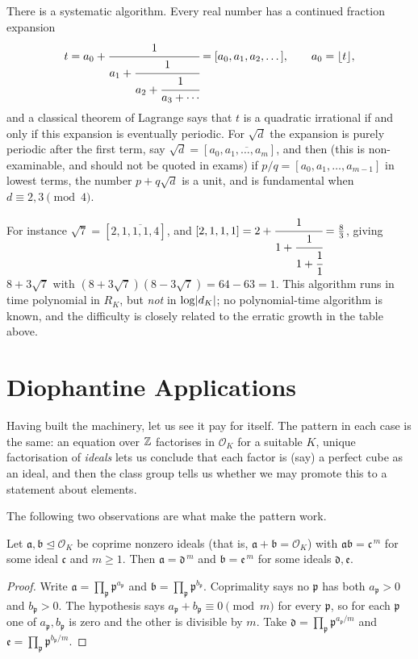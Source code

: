 \documentclass[a4paper]{scrartcl}
\renewcommand{\OO}{\mathcal{O}}
\newcommand{\fa}{\mathfrak{a}}
\newcommand{\fb}{\mathfrak{b}}
\newcommand{\fc}{\mathfrak{c}}
\newcommand{\fd}{\mathfrak{d}}
\newcommand{\fe}{\mathfrak{e}}
\newcommand{\fp}{\mathfrak{p}}
\begin{document}
\begin{remark}
	There is a systematic algorithm. Every real number has a continued fraction expansion
	$$t = a_0 + \cfrac{1}{a_1+\cfrac{1}{a_2+\cfrac{1}{a_3+\cdots}}} = [a_0,a_1,a_2,\dots], \qquad a_0 = \lfloor t\rfloor,$$
	and a classical theorem of Lagrange says that $t$ is a quadratic irrational if and only if this expansion is eventually periodic. For $\sqrt d$ the expansion is purely periodic after the first term, say $\sqrt d = [a_0,\overline{a_1,\dots,a_m}]$, and then (this is non-examinable, and should not be quoted in exams) if $p/q = [a_0,a_1,\dots,a_{m-1}]$ in lowest terms, the number $p+q\sqrt d$ is a unit, and is fundamental when $d \equiv 2,3\pmod4$.

	For instance $\sqrt7 = [2,\overline{1,1,1,4}]$, and $[2,1,1,1] = 2 + \cfrac{1}{1+\cfrac{1}{1+\cfrac11}} = \tfrac83$, giving $8+3\sqrt7$ with $(8+3\sqrt7)(8-3\sqrt7) = 64-63 = 1$. This algorithm runs in time polynomial in $R_K$, but \emph{not} in $\log\lvert d_K\rvert$; no polynomial-time algorithm is known, and the difficulty is closely related to the erratic growth in the table above.
\end{remark}

\section{Diophantine Applications}\label{sec:applications}

Having built the machinery, let us see it pay for itself. The pattern in each case is the same: an equation over $\mathbb{Z}$ factorises in $\OO_K$ for a suitable $K$, unique factorisation of \emph{ideals} lets us conclude that each factor is (say) a perfect cube as an ideal, and then the class group tells us whether we may promote this to a statement about elements.

The following two observations are what make the pattern work.

\begin{lemma}\label{lem:coprimepower}
	Let $\fa, \fb \trianglelefteq \OO_K$ be coprime nonzero ideals (that is, $\fa+\fb = \OO_K$) with $\fa\fb = \fc^{\,m}$ for some ideal $\fc$ and $m \geq 1$. Then $\fa = \fd^{\,m}$ and $\fb = \fe^{\,m}$ for some ideals $\fd, \fe$.
\end{lemma}

\begin{proof}
	Write $\fa = \prod_\fp\fp^{a_\fp}$ and $\fb = \prod_\fp\fp^{b_\fp}$. Coprimality says no $\fp$ has both $a_\fp > 0$ and $b_\fp > 0$. The hypothesis says $a_\fp+b_\fp \equiv 0 \pmod m$ for every $\fp$, so for each $\fp$ one of $a_\fp, b_\fp$ is zero and the other is divisible by $m$. Take $\fd = \prod_\fp\fp^{a_\fp/m}$ and $\fe = \prod_\fp \fp^{b_\fp/m}$.
\end{proof}
\end{document}
